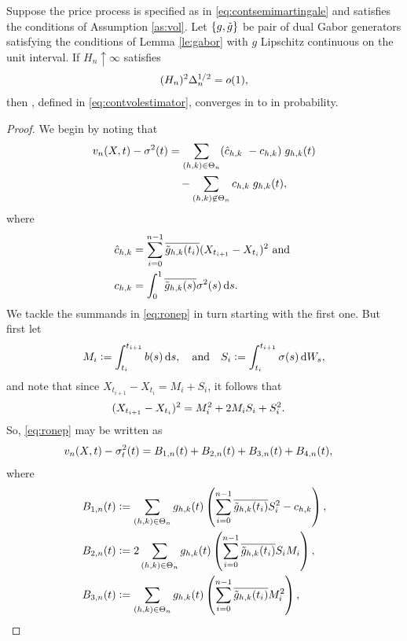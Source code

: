 \begin{prop}\label{pro:finite}
  Suppose the  price process is specified as in \eqref{eq:contsemimartingale} and satisfies the conditions of Assumption \ref{as:vol}. Let $\{g, \tilde{g}\}$ be pair of dual Gabor generators satisfying the conditions of Lemma \ref{le:gabor} with $g$  Lipschitz continuous on the unit interval. 
If $H_n \uparrow \infty$ satisfies 
  \begin{align}
    (H_n)^2 \Delta_n^{1/2} = o(1),\notag
    \label{}
  \end{align}
  then
  \svnx, defined in \eqref{eq:contvolestimator}, converges in \Ltwo to \sv in probability.
\end{prop}
\begin{proof} We begin by noting that 
\begin{align}
  v_n(X, t) - \sigma^2(t) & = \sum_{(h,k) \in \Theta_n} (\hat{c}_{h,k}\ - {c}_{h,k})\;g_{h,k}(t)\notag\\
  & \quad -\sum_{(h,k) \not\in \Theta_n} {c}_{h,k}\;g_{h,k}(t),\label{eq:ronep} 
\end{align}
  where 
\begin{align}  
  \cnhk &= \sum_{i =0}^{n-1} \btghki (X_{t_{i+1}} - X_{t_i})^2 \text{ and }\notag\\  
  \chk &= \int^1_0 \btghks \sigma^2(s) \D s. \notag
\end{align}
We tackle the summands in \eqref{eq:ronep} in turn starting with the first one. But first let 
\begin{align}
  M_i := \int_{t_i}^{t_{i+1}} b(s) \D s, \quad \text{and} \quad  S_i := \int_{t_i}^{t_{i+1}} \sigma(s) \D W_s, \notag
\end{align}
and note that since $X_{t_{i+1}} - X_{t_i} = M_i + S_i$, it follows that
\begin{align}
  (X_{t_{i+1}} - X_{t_i})^2 &= M_i^2  
  + 2M_iS_i +   S_i^2.\notag 
\end{align}
So, \eqref{eq:ronep} may be written as 
\begin{align}
  &v_n(X, t) - \sigma_t^2(t) = B_{1,n}(t) + B_{2,n}(t) + B_{3,n}(t) + B_{4,n}(t), \notag
\end{align}
where
\begin{align}
  &B_{1,n}(t) :=  \sumt g_{h,k}(t) \left(\sum_{i=0}^{n-1} \btghki S_i^2  - \chk\right), \notag\\
  &B_{2,n}(t) := 2 \sumt g_{h,k}(t)\left(\sum_{i=0}^{n-1} \btghki S_i M_i \right), \notag\\
  &B_{3,n}(t) := \sumt g_{h,k}(t)\left( \sum_{i=0}^{n-1} \btghki M_i^2 \right), \notag\\

\end{align}
\end{proof}
